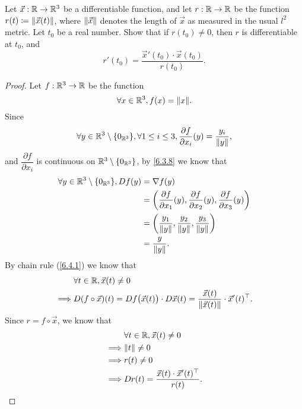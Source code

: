 \begin{ex}\label{ex:6.4.5}
  Let \(\vec{x} : \R \to \R^3\) be a differentiable function, and let \(r : \R \to \R\) be the function \(r(t) \coloneqq \norm*{\vec{x}(t)}\), where \(\norm*{\vec{x}}\) denotes the length of \(\vec{x}\) as measured in the usual \(l^2\) metric.
  Let \(t_0\) be a real number.
  Show that if \(r(t_0) \neq 0\), then \(r\) is differentiable at \(t_0\), and
  \[
    r'(t_0) = \dfrac{\vec{x}'(t_0) \cdot \vec{x}(t_0)}{r(t_0)}.
  \]
\end{ex}

\begin{proof}
  Let \(f : \R^3 \to \R\) be the function
  \[
    \forall x \in \R^3, f(x) = \norm*{x}.
  \]
  Since
  \[
    \forall y \in \R^3 \setminus \set{0_{\R^3}}, \forall 1 \leq i \leq 3, \dfrac{\partial f}{\partial x_i}(y) = \dfrac{y_i}{\norm*{y}},
  \]
  and \(\dfrac{\partial f}{\partial x_i}\) is continuous on \(\R^3 \setminus \set{0_{\R^3}}\), by \cref{6.3.8} we know that
  \begin{align*}
    \forall y \in \R^3 \setminus \set{0_{\R^3}}, D f(y) & = \nabla f(y)                                                                                                               \\
                                                        & = \bigg(\dfrac{\partial f}{\partial x_1}(y), \dfrac{\partial f}{\partial x_2}(y), \dfrac{\partial f}{\partial x_3}(y)\bigg) \\
                                                        & = \bigg(\dfrac{y_1}{\norm*{y}}, \dfrac{y_2}{\norm*{y}}, \dfrac{y_3}{\norm*{y}}\bigg)                                        \\
                                                        & = \dfrac{y}{\norm*{y}}.
  \end{align*}
  By chain rule (\cref{6.4.1}) we know that
  \begin{align*}
             & \forall t \in \R, \vec{x}(t) \neq 0                                                                                                  \\
    \implies & D (f \circ \vec{x})(t) = D f\big(\vec{x}(t)\big) \cdot D \vec{x}(t) = \dfrac{\vec{x}(t)}{\norm*{\vec{x}(t)}} \cdot \vec{x}'(t)^\top.
  \end{align*}
  Since \(r = f \circ \vec{x}\), we know that
  \begin{align*}
             & \forall t \in \R, \vec{x}(t) \neq 0                       \\
    \implies & \norm*{t} \neq 0                                          \\
    \implies & r(t) \neq 0                                               \\
    \implies & D r(t) = \dfrac{\vec{x}(t) \cdot \vec{x}'(t)^\top}{r(t)}.
  \end{align*}
\end{proof}